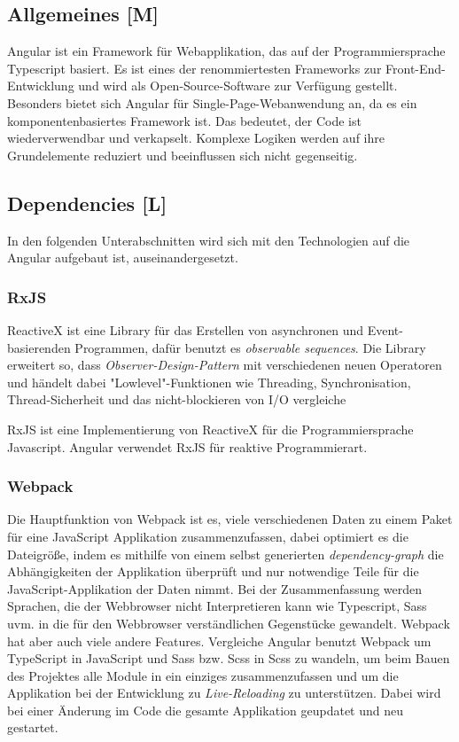\subsection{Allgemeines [M]}
Angular ist ein Framework für Webapplikation, das auf der Programmiersprache Typescript basiert. Es ist eines der renommiertesten Frameworks zur Front-End-Entwicklung und wird als Open-Source-Software zur Verfügung gestellt. Besonders bietet sich Angular für Single-Page-Webanwendung an, da es ein komponentenbasiertes Framework ist. Das bedeutet, der Code ist wiederverwendbar und verkapselt. Komplexe Logiken werden auf ihre Grundelemente reduziert und beeinflussen sich nicht gegenseitig. 
\cite{AngularGeneral}

\subsection{Dependencies [L]}
In den folgenden Unterabschnitten wird sich mit den Technologien auf die Angular aufgebaut ist, auseinandergesetzt. 
\subsubsection{RxJS}
ReactiveX ist eine Library für das Erstellen von asynchronen und Event-basierenden Programmen, dafür benutzt es  \emph{observable sequences}.
Die Library erweitert so, dass \emph{Observer-Design-Pattern} mit verschiedenen neuen Operatoren und händelt dabei "Lowlevel"-Funktionen wie Threading, Synchronisation, Thread-Sicherheit und das nicht-blockieren von I/O vergleiche \cite{ReactiveXIntro}

RxJS ist eine Implementierung von ReactiveX für die Programmiersprache Javascript. Angular verwendet RxJS für reaktive Programmierart.
\subsubsection{Webpack}
Die Hauptfunktion von Webpack ist es, viele verschiedenen Daten zu einem Paket für eine JavaScript Applikation zusammenzufassen, dabei optimiert es die Dateigröße, indem es mithilfe von einem selbst generierten \emph{dependency-graph} die Abhängigkeiten der Applikation überprüft und nur notwendige Teile für die JavaScript-Applikation der Daten nimmt. Bei der Zusammenfassung werden Sprachen, die der Webbrowser nicht Interpretieren kann wie Typescript, Sass uvm. in die für den Webbrowser verständlichen Gegenstücke gewandelt. Webpack hat aber auch viele andere Features. Vergleiche \cite{Webpack}
Angular benutzt Webpack um TypeScript in JavaScript und Sass bzw. Scss in Scss zu wandeln, um beim Bauen des Projektes alle Module in ein einziges zusammenzufassen und um die Applikation bei der Entwicklung zu \emph{Live-Reloading} zu unterstützen. Dabei wird bei einer Änderung im Code die gesamte Applikation geupdatet und neu gestartet. 

